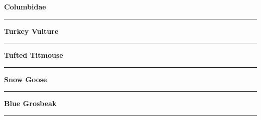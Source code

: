 \documentclass[11pt]{exam}
\newcommand*\Matching[1]{
\ifprintanswers
	\textbf{#1}
\else
	\rule{2.5in}{0.4pt}
\fi
}
\newlength\matchlena
\newlength\matchlenb
\newcommand\MatchQuestion[2]{%
	\setlength\matchlenb{\linewidth}
	\addtolength\matchlenb{-\matchlena}
	\parbox[t]{\matchlena}{\Matching{#1}}\enspace\parbox[t]{\matchlenb}{#2}}
\begin{document}
\begin{questions}
\begin{multicols}{2}
\question\MatchQuestion{Columbidae}{}
\vspace{2\baselineskip}

\question\MatchQuestion{Turkey Vulture}{}
\vspace{2\baselineskip}

\question\MatchQuestion{Tufted Titmouse}{}
\vspace{2\baselineskip}

\question[\textsc{ec}]\MatchQuestion{Snow Goose}{}
\vspace{2\baselineskip}

\question\MatchQuestion{Blue Grosbeak}{}
\vspace{2\baselineskip}

%



\end{multicols}
\end{questions}
\end{document}
